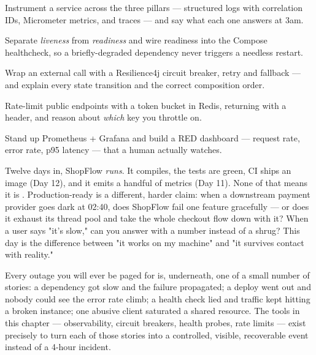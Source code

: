 
\begin{objectives}
\begin{wbitem}
  \item Instrument a service across the three pillars --- structured logs with correlation IDs, Micrometer metrics, and traces --- and say what each one answers at 3am.
  \item Separate \emph{liveness} from \emph{readiness} and wire readiness into the Compose healthcheck, so a briefly-degraded dependency never triggers a needless restart.
  \item Wrap an external call with a Resilience4j circuit breaker, retry and fallback --- and explain every state transition and the correct composition order.
  \item Rate-limit public endpoints with a token bucket in Redis, returning  with a  header, and reason about \emph{which} key you throttle on.
  \item Stand up Prometheus + Grafana and build a RED dashboard --- request rate, error rate, p95 latency --- that a human actually watches.
\end{wbitem}
\end{objectives}


 Twelve days in, ShopFlow \emph{runs}. It compiles, the tests are green, CI ships an image (Day 12), and it emits a handful of metrics (Day 11). None of that means it is . Production-ready is a different, harder claim: when a downstream payment provider goes dark at 02:40, does ShopFlow fail one feature gracefully --- or does it exhaust its thread pool and take the whole checkout flow down with it? When a user says "it's slow," can you answer with a number instead of a shrug? This day is the difference between "it works on my machine" and "it survives contact with reality."

 Every outage you will ever be paged for is, underneath, one of a small number of stories: a dependency got slow and the failure propagated; a deploy went out and nobody could see the error rate climb; a health check lied and traffic kept hitting a broken instance; one abusive client saturated a shared resource. The tools in this chapter --- observability, circuit breakers, health probes, rate limits --- exist precisely to turn each of those stories into a controlled, visible, recoverable event instead of a 4-hour incident.

